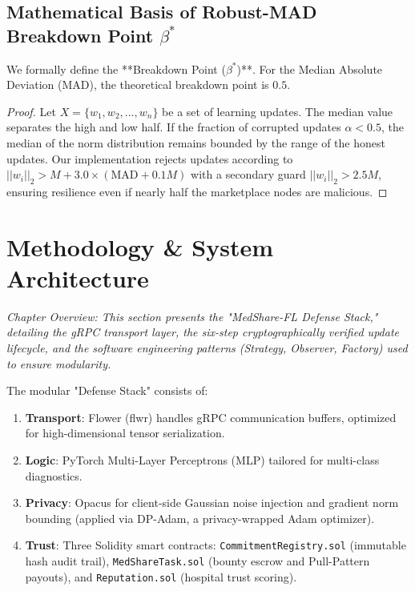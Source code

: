 \documentclass[10pt, a4paper, twocolumn]{article}
\begin{document}
\subsection{Mathematical Basis of Robust-MAD Breakdown Point \texorpdfstring{$\beta^*$}{beta*}}
We formally define the **Breakdown Point ($\beta^*$)**. For the Median Absolute Deviation (MAD), the theoretical breakdown point is $0.5$.
\begin{proof}
Let $X = \{w_1, w_2, ..., w_n\}$ be a set of learning updates. The median value separates the high and low half. If the fraction of corrupted updates $\alpha < 0.5$, the median of the norm distribution remains bounded by the range of the honest updates. Our implementation rejects updates according to $||w_i||_2 > M + 3.0 \times (\text{MAD} + 0.1M)$ with a secondary guard $||w_i||_2 > 2.5M$, ensuring resilience even if nearly half the marketplace nodes are malicious.
\end{proof}

\section{Methodology \& System Architecture}

\textit{Chapter Overview: This section presents the "MedShare-FL Defense Stack," detailing the gRPC transport layer, the six-step cryptographically verified update lifecycle, and the software engineering patterns (Strategy, Observer, Factory) used to ensure modularity.}

The modular "Defense Stack" consists of:
\begin{enumerate}
    \item \textbf{Transport}: Flower (flwr) \cite{beutel2022} handles gRPC communication buffers, optimized for high-dimensional tensor serialization.
    \item \textbf{Logic}: PyTorch Multi-Layer Perceptrons (MLP) tailored for multi-class diagnostics.
    \item \textbf{Privacy}: Opacus for client-side Gaussian noise injection and gradient norm bounding (applied via DP-Adam, a privacy-wrapped Adam optimizer).
    \item \textbf{Trust}: Three Solidity smart contracts: \texttt{CommitmentRegistry.sol} (immutable hash audit trail), \texttt{MedShareTask.sol} (bounty escrow and Pull-Pattern payouts), and \texttt{Reputation.sol} (hospital trust scoring).
\end{enumerate}
\end{document}
